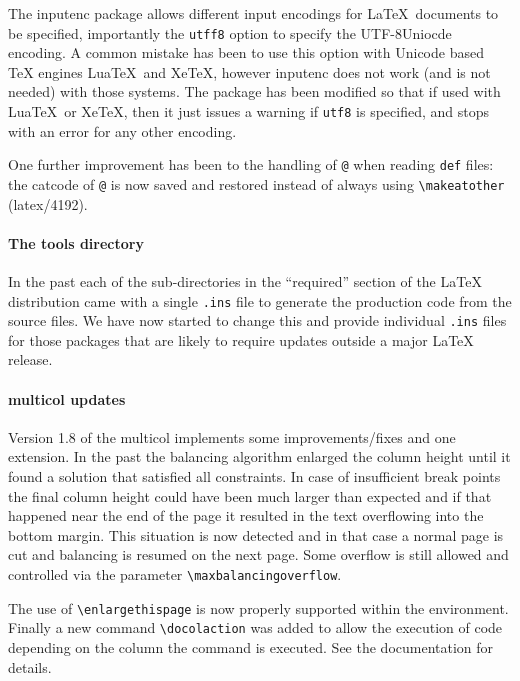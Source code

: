 \documentclass{ltnews}
\begin{document}
The \textsf{inputenc} package allows different input encodings for
\LaTeX\ documents to be specified, importantly the \texttt{utff8}
option to specify the UTF-8Uniocde encoding. A common mistake has been
to use this option with Unicode based TeX engines Lua\TeX\ and Xe\TeX,
however \textsf{inputenc} does not work (and is not needed) with those
systems. The package has been modified so that if used with  Lua\TeX\
or  Xe\TeX, then it just issues a warning if \texttt{utf8} is
specified, and stops with an error for any other encoding.

One further improvement has been to the handling of \texttt{@} when
  reading \texttt{def} files: the  catcode of \texttt{@} is now saved
  and restored instead of always using \verb=\makeatother=  (latex/4192).



\paragraph{The tools directory}

In the past each of the sub-directories in the ``required'' section of
the \LaTeX{} distribution came with a single \texttt{.ins} file to
generate the production code from the source files. We have now
started to change this and provide individual \texttt{.ins} files for
those packages that are likely to require updates outside a major
\LaTeX{} release.

\paragraph{\textsf{multicol} updates}

Version 1.8 of the \textsf{multicol} implements some
improvements/fixes and one extension. In the past the balancing
algorithm enlarged the column height until it found a solution that
satisfied all constraints. In case of insufficient break points the
final column height could have been much larger than expected and if
that happened near the end of the page it resulted in the text
overflowing into the bottom margin. This situation is now detected and
in that case a normal page is cut and balancing is resumed on the next
page. Some overflow is still allowed and controlled via the parameter
\verb=\maxbalancingoverflow=.

The use of \verb=\enlargethispage= is now properly supported
within the environment. Finally a new command \verb=\docolaction= was
added to allow the execution of code depending on the column the
command is executed. See the documentation for details.
\end{document}
